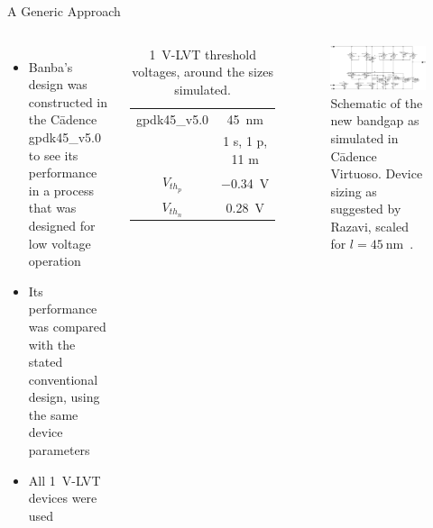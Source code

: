 \documentclass[aspectratio=1610]{beamer} %
\begin{document}
\begin{frame}{A Generic Approach}{}

    \begin{columns}[c]
        \begin{itemize}
            \item Banba's design was constructed in the C\=adence gpdk45\_v5.0 to see its performance in a process that was designed for low voltage operation
            \item Its performance was compared with the stated conventional design, using the same device parameters
            \item All \qty{1}{\V}-LVT devices were used
        \end{itemize}
        \begin{table}[]
            \centering
            \begin{tabular}{c|c}
            \toprule
                gpdk45\_v5.0 & \qty{45}{\nm} \\
                & 1 s, 1 p, 11 m \\
            \midrule
                \(V_{th_p}\) & \qty{-0.34}{\V} \\
                \(V_{th_n}\) & \qty{0.28}{\V} \\
            \bottomrule
            \end{tabular}
            \caption{\qty{1}{\V}-LVT threshold voltages, around the sizes simulated.}
            \label{tab:sim_th}
        \end{table}
    
        \begin{figure}
            \includegraphics[width=\columnwidth]{bg_prop_bw.eps}
            \caption{Schematic of the new bandgap as simulated in C\=adence Virtuoso. Device sizing as suggested by Razavi, scaled for \(l = \qty{45}{\nm}\)~\cite{Razavi2021}.}\label{fig:gpdk_prop}
        \end{figure}
    \end{columns}
\end{frame}
\end{document}
